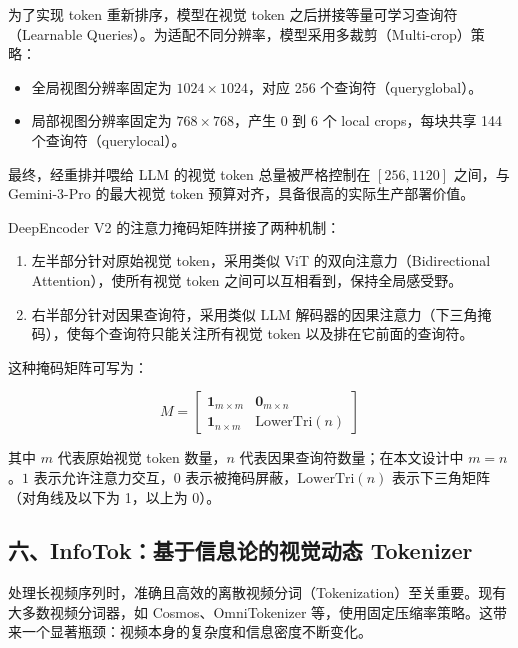 为了实现 token 重新排序，模型在视觉 token 之后拼接等量可学习查询符（Learnable Queries）。为适配不同分辨率，模型采用多裁剪（Multi-crop）策略：

\begin{itemize}
\tightlist
\item
  全局视图分辨率固定为 \(1024\times1024\)，对应 256 个查询符（queryglobal）。
\item
  局部视图分辨率固定为 \(768\times768\)，产生 0 到 6 个 local crops，每块共享 144 个查询符（querylocal）。
\end{itemize}

最终，经重排并喂给 LLM 的视觉 token 总量被严格控制在 \([256,1120]\) 之间，与 Gemini-3-Pro 的最大视觉 token 预算对齐，具备很高的实际生产部署价值。

DeepEncoder V2 的注意力掩码矩阵拼接了两种机制：

\begin{enumerate}
\def\labelenumi{\arabic{enumi}.}
\tightlist
\item
  左半部分针对原始视觉 token，采用类似 ViT 的双向注意力（Bidirectional Attention），使所有视觉 token 之间可以互相看到，保持全局感受野。
\item
  右半部分针对因果查询符，采用类似 LLM 解码器的因果注意力（下三角掩码），使每个查询符只能关注所有视觉 token 以及排在它前面的查询符。
\end{enumerate}

这种掩码矩阵可写为：

\[
M=
\begin{bmatrix}
\mathbf{1}_{m\times m} & \mathbf{0}_{m\times n} \\
\mathbf{1}_{n\times m} & \mathrm{LowerTri}(n)
\end{bmatrix}
\]

其中 \(m\) 代表原始视觉 token 数量，\(n\) 代表因果查询符数量；在本文设计中 \(m=n\)。\(1\) 表示允许注意力交互，\(0\) 表示被掩码屏蔽，\(\mathrm{LowerTri}(n)\) 表示下三角矩阵（对角线及以下为 1，以上为 0）。

\hypertarget{ux516dinfotokux57faux4e8eux4fe1ux606fux8bbaux7684ux89c6ux89c9ux52a8ux6001-tokenizer}{%
\subsection{六、InfoTok：基于信息论的视觉动态 Tokenizer}\label{ux516dinfotokux57faux4e8eux4fe1ux606fux8bbaux7684ux89c6ux89c9ux52a8ux6001-tokenizer}}

处理长视频序列时，准确且高效的离散视频分词（Tokenization）至关重要。现有大多数视频分词器，如 Cosmos、OmniTokenizer 等，使用固定压缩率策略。这带来一个显著瓶颈：视频本身的复杂度和信息密度不断变化。

